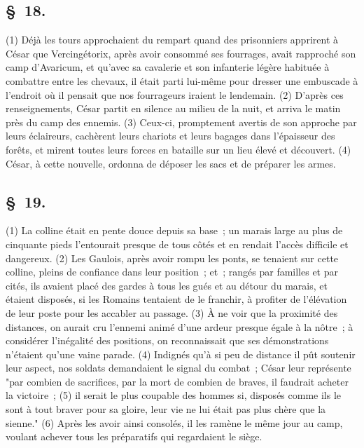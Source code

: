 \documentclass[french,twoside]{book} %
\begin{document}
\subsection[{§ 18.}]{ \textsc{§ 18.} }
\noindent (1) Déjà les tours approchaient du rempart quand des prisonniers apprirent à César que Vercingétorix, après avoir consommé ses fourrages, avait rapproché son camp d’Avaricum, et qu’avec sa cavalerie et son infanterie légère habituée à combattre entre les chevaux, il était parti lui-même pour dresser une embuscade à l’endroit où il pensait que nos fourrageurs iraient le lendemain. (2) D'après ces renseignements, César partit en silence au milieu de la nuit, et arriva le matin près du camp des ennemis. (3) Ceux-ci, promptement avertis de son approche par leurs éclaireurs, cachèrent leurs chariots et leurs bagages dans l’épaisseur des forêts, et mirent toutes leurs forces en bataille sur un lieu élevé et découvert. (4) César, à cette nouvelle, ordonna de déposer les sacs et de préparer les armes.
\subsection[{§ 19.}]{ \textsc{§ 19.} }
\noindent (1) La colline était en pente douce depuis sa base ; un marais large au plus de cinquante pieds l’entourait presque de tous côtés et en rendait l’accès difficile et dangereux. (2) Les Gaulois, après avoir rompu les ponts, se tenaient sur cette colline, pleins de confiance dans leur position ; et ; rangés par familles et par cités, ils avaient placé des gardes à tous les gués et au détour du marais, et étaient disposés, si les Romains tentaient de le franchir, à profiter de l’élévation de leur poste pour les accabler au passage. (3) À ne voir que la proximité des distances, on aurait cru l’ennemi animé d’une ardeur presque égale à la nôtre ; à considérer l’inégalité des positions, on reconnaissait que ses démonstrations n’étaient qu’une vaine parade. (4) Indignés qu’à si peu de distance il pût soutenir leur aspect, nos soldats demandaient le signal du combat ; César leur représente "par combien de sacrifices, par la mort de combien de braves, il faudrait acheter la victoire ; (5) il serait le plus coupable des hommes si, disposés comme ils le sont à tout braver pour sa gloire, leur vie ne lui était pas plus chère que la sienne." (6) Après les avoir ainsi consolés, il les ramène le même jour au camp, voulant achever tous les préparatifs qui regardaient le siège.
\end{document}
